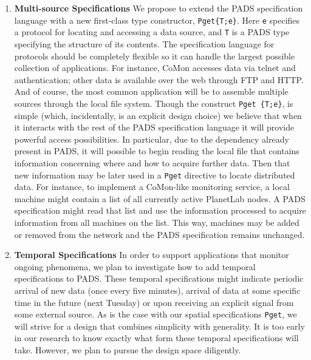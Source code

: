 \begin{enumerate}
\item {\bf Multi-source Specifications}  
We propose to extend the PADS specification language with a new first-class
type constructor, \texttt{Pget\{T;e\}}.  Here \texttt{e} specifies
a protocol for locating and accessing a data source, and \texttt{T} is a PADS type specifying the
structure of its contents.  The specification language for protocols should be completely flexible
so it can handle the largest possible collection of applications.  For instance,
CoMon accesses data via telnet and authentication; other data is available over the web
through FTP and HTTP.  And of course, the most common application will be to assemble
multiple sources through the local file system.  Though the construct \texttt{Pget \{T;e\}},
is simple (which, incidentally, is an explicit design choice)
we believe that when it interacts with the rest of the PADS specification language
it will provide powerful access possibilities.  In particular, due to the dependency 
already present in PADS, it will possible to begin reading the local file that contains information
concerning where and how to acquire further data.  Then that new information may be later used
in a \texttt{Pget} directive to locate distributed data.  For instance, to implement
a CoMon-like monitoring service, a local machine might contain a list of all currently active
PlanetLab nodes.  A PADS specification might read that list and use the information processed to
acquire information from all machines on the list.  This way, machines may be added or removed
from the network and the PADS specification remains unchanged.


\item {\bf Temporal Specifications}
In order to support applications that monitor ongoing phenomena, we plan to investigate how to add
temporal specifications to PADS.  These temporal specifications might indicate periodic arrival of
new data (once every five minutes), arrival of data at some specific time in the future (next Tuesday)
or upon receiving an explicit signal from some external source.  As is the case with our 
spatial specifications \texttt{Pget}, we will strive for a design that combines simplicity with
generality.  It is too early in our research to know exactly what form these temporal specifications 
will take.  However, we plan to pursue the design space diligently.


\end{enumerate}
